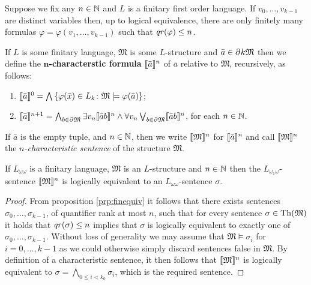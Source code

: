\begin{prp}\label{prp:finequiv}
	Suppose we fix any $n\in\mathbb{N}$ and $L$ is a finitary first order language. If $v_0,\dotsc,v_{k-1}$ are distinct variables then, up to logical equivalence, there are only finitely many formulas $\varphi=\varphi(v_1,\dotsc,v_{k-1})$ such that $\mathit{qr}(\varphi)\leq n$.
\end{prp}

\begin{dfn}
	If $L$ is some finitary language, $\mathfrak{M}$ is some $L$-structure and $\bar{a}\in\partial^{}{k}{\mathfrak{M}}$ then we define the \textbf{$\mathbf{n}$-characterstic formula} $\llbracket\bar{a}\rrbracket^{n}$ of $\bar{a}$ relative to $\mathfrak{M}$, recursively, as follows:
	\begin{enumerate}
		\item $\llbracket\bar{a}\rrbracket^{0}=\bigwedge\left\lbrace \varphi(\bar{x})\in L_k\colon \mathfrak{M}\models\varphi(\bar{a}) \right\rbrace$;
		\item $\llbracket\bar{a}\rrbracket^{n+1}=\bigwedge_{b\in\partial^{}{}\mathfrak{M}}\exists v_n \llbracket\bar{a}b\rrbracket^{n}\wedge\forall v_n\bigvee_{b\in\partial^{}{}\mathfrak{M}}\llbracket\bar{a}b\rrbracket^{n}$, for each $n\in\mathbb{N}$.
	\end{enumerate}
	If $\bar{a}$ is the empty tuple, and $n\in\mathbb{N}$, then we write $\llbracket\mathfrak{M}\rrbracket^{n}$ for $\llbracket\bar{a}\rrbracket^{n}$ and call $\llbracket\mathfrak{M}\rrbracket^{n}$ the \textit{$\mathit{n}$-characteristic sentence} of the structure $\mathfrak{M}$.
\end{dfn}

\begin{prp}
	If $L_{\omega\omega}$ is a finitary language, $\mathfrak{M}$ is an $L$-structure and $n\in\mathbb{N}$ then the $L_{\omega_1\omega}$-sentence $\llbracket\mathfrak{M}\rrbracket^{n}$ is logically equivalent to an $L_{\omega\omega}$-sentence $\sigma$.
\end{prp}
\begin{proof}
	From proposition \ref{prp:finequiv} it follows that there exists sentences $\sigma_0,\dotsc,\sigma_{k-1}$, of quantifier rank at most $n$, such that for every sentence $\sigma\in\operatorname{Th}(\mathfrak{M})$ it holds that $\mathit{qr}(\sigma)\leq n$ implies that $\sigma$ is logically equivalent to exactly one of $\sigma_0,\dotsc,\sigma_{k-1}$.  Without loss of generality we may assume that $\mathfrak{M}\models\sigma_i$ for $i=0,\dotsc,k-1$ as we could otherwise simply discard sentences false in $\mathfrak{M}$. By definition of a characteristic sentence, it then follows that $\llbracket\mathfrak{M}\rrbracket^{n}$ is logically equivalent to $\sigma=\bigwedge_{0\leq i<k_0}\sigma_i$, which is the required sentence.
\end{proof}

